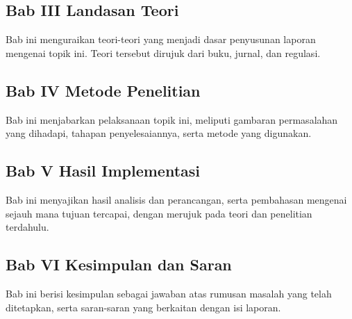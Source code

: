\subsection{Bab III Landasan Teori}
Bab ini menguraikan teori-teori yang menjadi dasar penyusunan laporan mengenai topik ini. Teori tersebut dirujuk dari buku, jurnal, dan regulasi.

\subsection{Bab IV Metode Penelitian}
Bab ini menjabarkan pelaksanaan topik ini, meliputi gambaran permasalahan yang dihadapi, tahapan penyelesaiannya, serta metode yang digunakan.

\subsection{Bab V Hasil Implementasi}
Bab ini menyajikan hasil analisis dan perancangan, serta pembahasan mengenai sejauh mana tujuan tercapai, dengan merujuk pada teori dan penelitian terdahulu.

\subsection{Bab VI Kesimpulan dan Saran}
Bab ini berisi kesimpulan sebagai jawaban atas rumusan masalah yang telah ditetapkan, serta saran-saran yang berkaitan dengan isi laporan.
